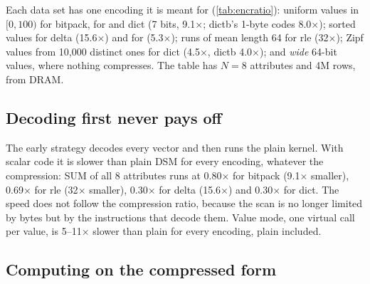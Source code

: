
\begin{table}[t]
\centering\small
\caption{Compression ratio (uncompressed bytes / encoded bytes) per data set.}
\label{tab:encratio}
\end{table}

Each data set has one encoding it is meant for (\cref{tab:encratio}): uniform values in
$[0,100)$ for bitpack, for and dict (7 bits, 9.1$\times$; dictb's 1-byte codes 8.0$\times$);
sorted values for delta (15.6$\times$) and for (5.3$\times$); runs of mean length 64 for rle
(32$\times$); Zipf values from 10{,}000 distinct ones for dict (4.5$\times$, dictb 4.0$\times$);
and \emph{wide} 64-bit values, where nothing compresses. The table has $N{=}8$ attributes and
4M rows, from DRAM.

\subsection{Decoding first never pays off}
\label{sec:enc:decode}

\begin{table}[t]
\centering\small
\caption{Speedup over plain DSM, best strategy, scalar / AVX2 kernels. Above 1 the encoding is
faster than the uncompressed column.}
\label{tab:encspeed}
\end{table}

The early strategy decodes every vector and then runs the plain kernel. With scalar code it is
slower than plain DSM for every encoding, whatever the compression: SUM of all 8 attributes
runs at 0.80$\times$ for bitpack (9.1$\times$ smaller), 0.69$\times$ for rle (32$\times$
smaller), 0.30$\times$ for delta (15.6$\times$) and 0.30$\times$ for dict. The speed does not
follow the compression ratio, because the scan is no longer limited by bytes but by the
instructions that decode them. Value mode, one virtual call per value, is 5--11$\times$ slower
than plain for every encoding, plain included.

\subsection{Computing on the compressed form}
\label{sec:enc:compressed}

